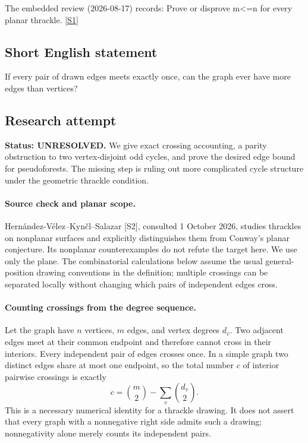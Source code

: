 \documentclass[11pt,a4paper]{article}
\newcommand{\sref}[2]{\hyperlink{source:#1:#2}{[S#2]}}
\begin{document}
The embedded review (2026-08-17) records: Prove or disprove m<=n for every planar thrackle. \sref{1403}{1}

\subsection{Short English statement}

If every pair of drawn edges meets exactly once, can the graph ever have more edges than vertices?

\subsection{Research attempt}
\textbf{Status: UNRESOLVED.} We give exact crossing accounting, a parity obstruction to two vertex-disjoint odd cycles, and prove the desired edge bound for pseudoforests. The missing step is ruling out more complicated cycle structure under the geometric thrackle condition.

\paragraph{Source check and planar scope.}
Hern\'andez-V\'elez--Kyn\v cl--Salazar [S2], consulted 1 October 2026, studies thrackles on nonplanar surfaces and explicitly distinguishes them from Conway's planar conjecture. Its nonplanar counterexamples do not refute the target here. We use only the plane. The combinatorial calculations below assume the usual general-position drawing conventions in the definition; multiple crossings can be separated locally without changing which pairs of independent edges cross.

\paragraph{Counting crossings from the degree sequence.}
Let the graph have $n$ vertices, $m$ edges, and vertex degrees $d_v$. Two adjacent edges meet at their common endpoint and therefore cannot cross in their interiors. Every independent pair of edges crosses once. In a simple graph two distinct edges share at most one endpoint, so the total number $c$ of interior pairwise crossings is exactly
\[
c=\binom m2-\sum_v\binom{d_v}{2}.
\]
This is a necessary numerical identity for a thrackle drawing. It does not assert that every graph with a nonnegative right side admits such a drawing; nonnegativity alone merely counts its independent pairs.
\end{document}
